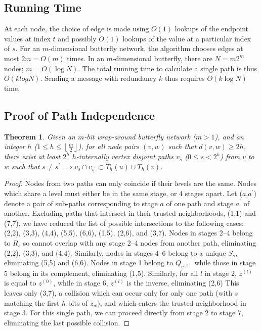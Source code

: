 \documentclass[10pt,letterpaper]{article}
\newtheorem{theorem}{Theorem}
\begin{document}
\subsection*{Running Time}
At each node, the choice of edge is made using $O(1)$ lookups of the endpoint
values at index $t$ and possibly $O(1)$ lookups of the value at a particular index of $s$.
For an $m$-dimensional butterfly network, the algorithm chooses edges at most $2m = O(m)$ times.
In an $m$-dimensional butterfly, there are $N = m2^m$ nodes; $m = O(\log N)$.
The total running time to calculate a single path is thus $O(k log N)$.
Sending a message with redundancy $k$ thus requires $O(k \log N)$ time.

\subsection*{Proof of Path Independence}

\begin{theorem}
Given an $m$-bit wrap-around butterfly network ($m > 1$),
and an integer $h$ ($1 \leq h \leq \left\lfloor \frac{m}{2} \right\rfloor$),
for all node pairs $(v, w)$ such that $d(v,w) \geq 2h$,
there exist at least $2^h$ $h$-internally vertex disjoint
paths $v_s$ ($0 \le s < 2^h$) from
$v$ to $w$ such that
$s \neq s^\prime \implies v_s \cap v_{s^\prime} \subset T_h(u) \cup T_h(v)$.
\end{theorem}
\begin{proof}
Nodes from two paths can only coincide if their levels are the same.
Nodes which share a level must either be in the same stage, or 4 stages
apart.
Let ($a$,$a^\prime$) denote a pair of sub-paths corresponding to stage $a$ of
one path and stage $a^\prime$ of another.
Excluding paths that intersect in their trusted neighborhoods, (1,1) and (7,7),
we have reduced the list of possible intersections to the following cases:
(2,2), (3,3), (4,4), (5,5), (6,6), (1,5), (2,6), and (3,7).
Nodes in stages 2--4 belong to $R_s$ so cannot overlap with any stage 2--4
nodes from another path, eliminating (2,2), (3,3), and (4,4).
Similarly, nodes in stages 4--6 belong to a unique $S_s$,
eliminating (5,5) and (6,6).
Nodes in stage 1 belong to $Q_{v^{(0)}}$ while those in stage 5 belong in
its complement, eliminating (1,5).
Similarly, for all $l$ in stage 2, $z^{(l)}$ is equal to $z^{(0)}$,
while in stage 6, $z^{(l)}$ is the inverse, eliminating (2,6)
This leaves only (3,7), a collision which can occur only for only one path
(with $s$ matching the first $h$ bits of $z_w$), and which enters the trusted
neighborhood in stage 3.
For this single path, we can proceed directly from stage 2 to stage 7,
eliminating the last possible collision.
\end{proof}
\end{document}
